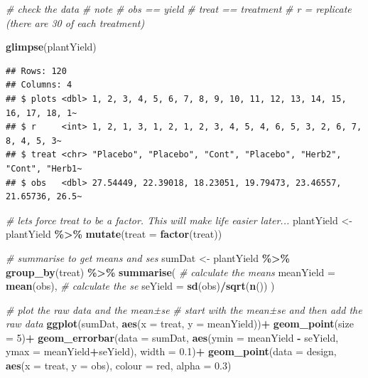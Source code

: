 \documentclass[
]{book}
\newenvironment{Shaded}{\begin{snugshade}}{\end{snugshade}}
\newcommand{\AttributeTok}[1]{\textcolor[rgb]{0.13,0.29,0.53}{#1}}
\newcommand{\CommentTok}[1]{\textcolor[rgb]{0.56,0.35,0.01}{\textit{#1}}}
\newcommand{\DecValTok}[1]{\textcolor[rgb]{0.00,0.00,0.81}{#1}}
\newcommand{\FloatTok}[1]{\textcolor[rgb]{0.00,0.00,0.81}{#1}}
\newcommand{\FunctionTok}[1]{\textcolor[rgb]{0.13,0.29,0.53}{\textbf{#1}}}
\newcommand{\NormalTok}[1]{#1}
\newcommand{\OtherTok}[1]{\textcolor[rgb]{0.56,0.35,0.01}{#1}}
\newcommand{\SpecialCharTok}[1]{\textcolor[rgb]{0.81,0.36,0.00}{\textbf{#1}}}
\newcommand{\StringTok}[1]{\textcolor[rgb]{0.31,0.60,0.02}{#1}}
\begin{document}
\begin{Shaded}
\begin{Highlighting}[]
\CommentTok{\# check the data}
\CommentTok{\# note}
\CommentTok{\# obs == yield}
\CommentTok{\# treat == treatment}
\CommentTok{\# r = replicate (there are 30 of each treatment)}

\FunctionTok{glimpse}\NormalTok{(plantYield)}
\end{Highlighting}
\end{Shaded}

\begin{verbatim}
## Rows: 120
## Columns: 4
## $ plots <dbl> 1, 2, 3, 4, 5, 6, 7, 8, 9, 10, 11, 12, 13, 14, 15, 16, 17, 18, 1~
## $ r     <int> 1, 2, 1, 3, 1, 2, 1, 2, 3, 4, 5, 4, 6, 5, 3, 2, 6, 7, 8, 4, 5, 3~
## $ treat <chr> "Placebo", "Placebo", "Cont", "Placebo", "Herb2", "Cont", "Herb1~
## $ obs   <dbl> 27.54449, 22.39018, 18.23051, 19.79473, 23.46557, 21.65736, 26.5~
\end{verbatim}

\begin{Shaded}
\begin{Highlighting}[]
\CommentTok{\# let\textquotesingle{}s force treat to be a factor.  This will make life easier later...}
\NormalTok{plantYield }\OtherTok{\textless{}{-}}\NormalTok{ plantYield }\SpecialCharTok{\%\textgreater{}\%} 
  \FunctionTok{mutate}\NormalTok{(}\AttributeTok{treat =} \FunctionTok{factor}\NormalTok{(treat))}

\CommentTok{\# summarise to get means and ses}
\NormalTok{sumDat }\OtherTok{\textless{}{-}}\NormalTok{ plantYield }\SpecialCharTok{\%\textgreater{}\%} 
  \FunctionTok{group\_by}\NormalTok{(treat) }\SpecialCharTok{\%\textgreater{}\%} 
  \FunctionTok{summarise}\NormalTok{(}
    \CommentTok{\# calculate the means}
    \AttributeTok{meanYield =} \FunctionTok{mean}\NormalTok{(obs),}
    \CommentTok{\# calculate the se}
    \AttributeTok{seYield =} \FunctionTok{sd}\NormalTok{(obs)}\SpecialCharTok{/}\FunctionTok{sqrt}\NormalTok{(}\FunctionTok{n}\NormalTok{())}
\NormalTok{  )}

\CommentTok{\# plot the raw data and the mean±se}
\CommentTok{\# start with the mean±se and then add the raw data}
\FunctionTok{ggplot}\NormalTok{(sumDat, }\FunctionTok{aes}\NormalTok{(}\AttributeTok{x =}\NormalTok{ treat, }\AttributeTok{y =}\NormalTok{ meanYield))}\SpecialCharTok{+}
  \FunctionTok{geom\_point}\NormalTok{(}\AttributeTok{size =} \DecValTok{5}\NormalTok{)}\SpecialCharTok{+}
  \FunctionTok{geom\_errorbar}\NormalTok{(}\AttributeTok{data =}\NormalTok{ sumDat, }\FunctionTok{aes}\NormalTok{(}\AttributeTok{ymin =}\NormalTok{ meanYield }\SpecialCharTok{{-}}\NormalTok{ seYield, }\AttributeTok{ymax =}\NormalTok{ meanYield}\SpecialCharTok{+}\NormalTok{seYield),}
                \AttributeTok{width =} \FloatTok{0.1}\NormalTok{)}\SpecialCharTok{+}
  \FunctionTok{geom\_point}\NormalTok{(}\AttributeTok{data =}\NormalTok{ design, }\FunctionTok{aes}\NormalTok{(}\AttributeTok{x =}\NormalTok{ treat, }\AttributeTok{y =}\NormalTok{ obs), }\AttributeTok{colour =} \StringTok{\textquotesingle{}red\textquotesingle{}}\NormalTok{, }\AttributeTok{alpha =} \FloatTok{0.3}\NormalTok{)}
\end{Highlighting}
\end{Shaded}
\end{document}
